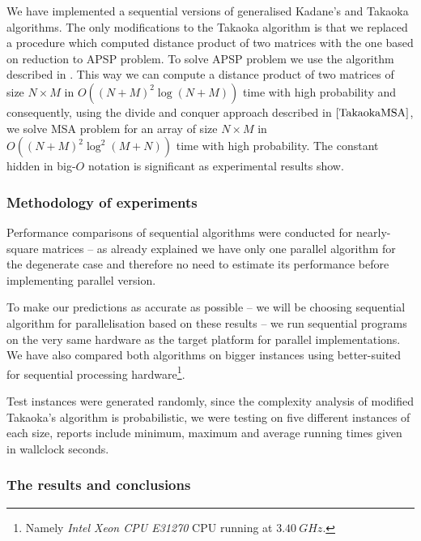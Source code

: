 We have implemented a sequential versions of generalised Kadane's and Takaoka \cite{TakaokaMSA} algorithms.
The only modifications to the Takaoka algorithm is that we replaced a procedure which computed distance product of two matrices with the one based on reduction to APSP problem.
To solve APSP problem we use the algorithm described in \cite{TakaokaHashim}.
This way we can compute a distance product of two matrices of size $N \times M$ in $O((N + M)^2 \log{(N + M)})$ time with high probability and consequently, using the divide and conquer approach described in $\cite{TakaokaMSA}$, we solve MSA problem for an array of size $N \times M$ in $O((N + M)^2 \log^2{(M + N)})$ time with high probability.
The constant hidden in big-$O$ notation is significant as experimental results show.

\subsubsection*{Methodology of experiments}

Performance comparisons of sequential algorithms were conducted for nearly-square matrices -- as already explained we have only one parallel algorithm for the degenerate case and therefore no need to estimate its performance before implementing parallel version.

To make our predictions as accurate as possible -- we will be choosing sequential algorithm for parallelisation based on these results -- we run sequential programs on the very same hardware as the target platform for parallel implementations.
We have also compared both algorithms on bigger instances using better-suited for sequential processing hardware\footnote{Namely \emph{Intel Xeon CPU E31270} CPU running at $\SI{3.40}{GHz}$.}.

Test instances were generated randomly, since the complexity analysis of modified Takaoka's algorithm is probabilistic, we were testing on five different instances of each size, reports include minimum, maximum and average running times given in wallclock seconds.

\subsubsection*{The results and conclusions}

